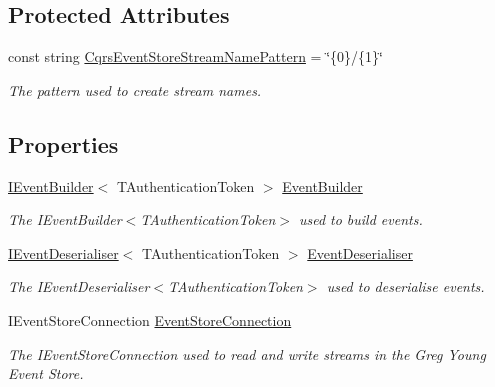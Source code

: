 \subsection*{Protected Attributes}
\begin{DoxyCompactItemize}
\item 
const string \hyperlink{classCqrs_1_1EventStore_1_1EventStore_ae9733f8511daf86ae3dac78bcbc5b2f0_ae9733f8511daf86ae3dac78bcbc5b2f0}{Cqrs\+Event\+Store\+Stream\+Name\+Pattern} = \char`\"{}\{0\}/\{1\}\char`\"{}
\begin{DoxyCompactList}\small\item\em The pattern used to create stream names. \end{DoxyCompactList}\end{DoxyCompactItemize}
\subsection*{Properties}
\begin{DoxyCompactItemize}
\item 
\hyperlink{interfaceCqrs_1_1EventStore_1_1IEventBuilder}{I\+Event\+Builder}$<$ T\+Authentication\+Token $>$ \hyperlink{classCqrs_1_1EventStore_1_1EventStore_ae1bc9d364582e951ccdc0f91908b94a2_ae1bc9d364582e951ccdc0f91908b94a2}{Event\+Builder}
\begin{DoxyCompactList}\small\item\em The I\+Event\+Builder$<$\+T\+Authentication\+Token$>$ used to build events. \end{DoxyCompactList}\item 
\hyperlink{interfaceCqrs_1_1EventStore_1_1IEventDeserialiser}{I\+Event\+Deserialiser}$<$ T\+Authentication\+Token $>$ \hyperlink{classCqrs_1_1EventStore_1_1EventStore_a2b9140681d6bd25afb3a842e4cbf37cf_a2b9140681d6bd25afb3a842e4cbf37cf}{Event\+Deserialiser}
\begin{DoxyCompactList}\small\item\em The I\+Event\+Deserialiser$<$\+T\+Authentication\+Token$>$ used to deserialise events. \end{DoxyCompactList}\item 
I\+Event\+Store\+Connection \hyperlink{classCqrs_1_1EventStore_1_1EventStore_ab1184aea49c7b0009a8f27d38f585952_ab1184aea49c7b0009a8f27d38f585952}{Event\+Store\+Connection}
\begin{DoxyCompactList}\small\item\em The I\+Event\+Store\+Connection used to read and write streams in the Greg Young Event Store. \end{DoxyCompactList}\end{DoxyCompactItemize}



